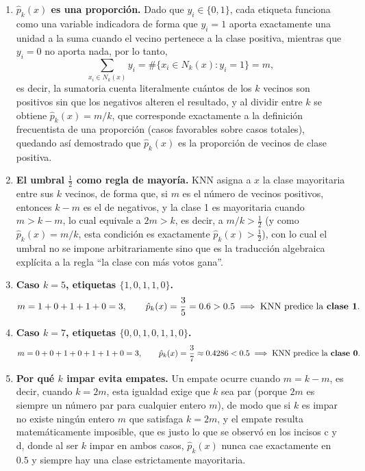 \begin{enumerate}

\item \textbf{$\hat p_k(x)$ es una proporción.}
Dado que $y_i\in\{0,1\}$, cada etiqueta funciona como una variable
indicadora de forma que $y_i=1$ aporta exactamente una unidad a la
suma cuando el vecino pertenece a la clase positiva, mientras que
$y_i=0$ no aporta nada, por lo tanto,
\[
    \sum_{x_i\in N_k(x)} y_i = \#\{x_i\in N_k(x) : y_i = 1\} = m,
\]
es decir, la sumatoria cuenta literalmente cuántos de los $k$ vecinos
son positivos sin que los negativos alteren el resultado, y al dividir
entre $k$ se obtiene $\hat p_k(x)=m/k$, que corresponde exactamente a
la definición frecuentista de una proporción (casos favorables sobre
casos totales), quedando así demostrado que $\hat p_k(x)$ es la
proporción de vecinos de clase positiva.

\item \textbf{El umbral $\tfrac12$ como regla de mayoría.}
KNN asigna a $x$ la clase mayoritaria entre sus $k$ vecinos, de forma
que, si $m$ es el número de vecinos positivos, entonces $k-m$ es el de
negativos, y la clase 1 es mayoritaria cuando $m > k-m$, lo cual
equivale a $2m>k$, es decir, a $m/k>\tfrac12$ (y como
$\hat p_k(x)=m/k$, esta condición es exactamente
$\hat p_k(x) > \tfrac12$), con lo cual el umbral no se impone
arbitrariamente sino que es la traducción algebraica explícita a la
regla ``la clase con más votos gana''.

\item \textbf{Caso $k=5$, etiquetas $\{1,0,1,1,0\}$.}
\[
    m = 1+0+1+1+0 = 3, \qquad \hat p_k(x) = \frac{3}{5} = 0.6 > 0.5
    \;\Longrightarrow\; \text{KNN predice la \textbf{clase 1}.}
\]

\item \textbf{Caso $k=7$, etiquetas $\{0,0,1,0,1,1,0\}$.}
\[
    m = 0+0+1+0+1+1+0 = 3, \qquad \hat p_k(x) = \frac{3}{7} \approx 0.4286 < 0.5
    \;\Longrightarrow\; \text{KNN predice la \textbf{clase 0}.}
\]

\item \textbf{Por qué $k$ impar evita empates.}
Un empate ocurre cuando $m = k-m$, es decir, cuando $k=2m$, esta
igualdad exige que $k$ sea par (porque $2m$ es siempre un número par
para cualquier entero $m$), de modo que si $k$ es impar no existe
ningún entero $m$ que satisfaga $k=2m$, y el empate resulta
matemáticamente imposible, que es justo lo que se observó en los
incisos c y d, donde al ser $k$ impar en ambos casos, $\hat p_k(x)$
nunca cae exactamente en $0.5$ y siempre hay una clase estrictamente
mayoritaria.

\end{enumerate}

